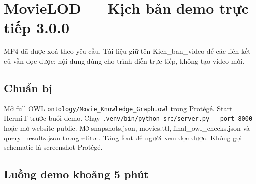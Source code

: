 \documentclass[
  11pt,
]{article}
\author{}
\date{}
\begin{document}
\section{MovieLOD --- Kịch bản demo trực tiếp
3.0.0}\label{movielod-kux1ecbch-bux1ea3n-demo-trux1ef1c-tiux1ebfp-3.0.0}

MP4 đã được xoá theo yêu cầu. Tài liệu giữ tên
Kich\_\allowbreak{}ban\allowbreak{}\_\allowbreak{}video để các liên kết
cũ vẫn đọc được; nội dung dùng cho trình diễn trực tiếp, không tạo video
mới.

\subsection{Chuẩn bị}\label{chuux1ea9n-bux1ecb}

Mở full OWL
\texttt{ontology\allowbreak{}/\allowbreak{}\allowbreak{}Movie\_\allowbreak{}\allowbreak{}K\allowbreak{}nowledge\allowbreak{}\_\allowbreak{}\allowbreak{}Graph.\allowbreak{}o\allowbreak{}wl}
trong Protégé. Start HermiT trước buổi demo. Chạy
\texttt{.\allowbreak{}venv/\allowbreak{}bi\allowbreak{}n/\allowbreak{}python\allowbreak{} src/\allowbreak{}ser\allowbreak{}ver.\allowbreak{}py -\allowbreak{}-\allowbreak{}port 80\allowbreak{}00}
hoặc mở website public. Mở snapshot\allowbreak{}s.\allowbreak{}json,
movies.ttl,
final\_\allowbreak{}ow\allowbreak{}l\_\allowbreak{}checks\allowbreak{}.\allowbreak{}json
và
query\_\allowbreak{}re\allowbreak{}sults.\allowbreak{}js\allowbreak{}on
trong editor. Tăng font để người xem đọc được. Không gọi schematic là
screenshot Protégé.

\subsection{Luồng demo khoảng 5
phút}\label{luux1ed3ng-demo-khoux1ea3ng-5-phuxfat}
\end{document}
